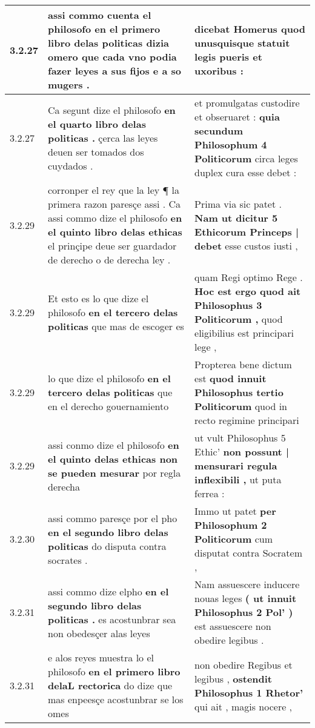\begin{tabular}{|p{1cm}|p{6.5cm}|p{6.5cm}|}
3.2.27 & assi commo cuenta el philosofo \textbf{ en el primero libro delas politicas } dizia omero que cada vno podia fazer leyes a sus fijos e a so mugers . & dicebat Homerus \textbf{ quod unusquisque statuit } legis pueris et uxoribus : \\\hline
3.2.27 & Ca segunt dize el philosofo \textbf{ en el quarto libro delas politicas . } çerca las leyes deuen ser tomados dos cuydados . & et promulgatas custodire et obseruaret : \textbf{ quia secundum Philosophum 4 Politicorum } circa leges duplex cura esse debet : \\\hline
3.2.29 & corronper el rey que la ley ¶ la primera razon paresçe assi . Ca assi commo dize el philosofo \textbf{ en el quinto libro delas ethicas } el prinçipe deue ser guardador de derecho o de derecha ley . & Prima via sic patet . \textbf{ Nam ut dicitur 5 Ethicorum Princeps | debet } esse custos iusti , \\\hline
3.2.29 & Et esto es lo que dize el philosofo \textbf{ en el tercero delas politicas } que mas de escoger es & quam Regi optimo Rege . \textbf{ Hoc est ergo quod ait Philosophus 3 Politicorum , } quod eligibilius est principari lege , \\\hline
3.2.29 & lo que dize el philosofo \textbf{ en el tercero delas politicas } que en el derecho gouernamiento & Propterea bene dictum est \textbf{ quod innuit Philosophus tertio Politicorum } quod in recto regimine principari \\\hline
3.2.29 & assi conmo dize el philosofo \textbf{ en el quinto delas ethicas non se pueden mesurar } por regla derecha & ut vult Philosophus 5 Ethic’ \textbf{ non possunt | mensurari regula inflexibili , } ut puta ferrea : \\\hline
3.2.30 & assi commo paresçe por el pho \textbf{ en el segundo libro delas politicas } do disputa contra socrates . & Immo ut patet \textbf{ per Philosophum 2 Politicorum } cum disputat contra Socratem , \\\hline
3.2.31 & assi commo dize elpho \textbf{ en el segundo libro delas politicas . } es acostunbrar sea non obedesçer alas leyes & Nam assuescere inducere nouas leges \textbf{ ( ut innuit Philosophus 2 Pol’ ) } est assuescere non obedire legibus . \\\hline
3.2.31 & e alos reyes muestra lo el philosofo \textbf{ en el primero libro delaL rectorica } do dize que mas enpeesçe acostunbrar se los omes & non obedire Regibus et legibus , \textbf{ ostendit Philosophus 1 Rhetor’ } qui ait , magis nocere , \\\hline

\end{tabular}

